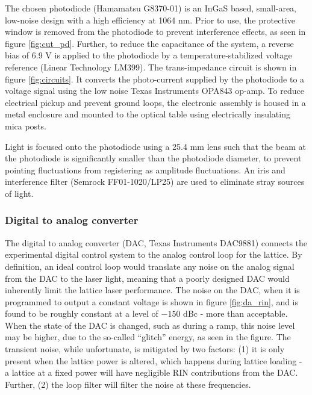 \documentclass[twocolumn,aps,pra,showpacs,preprintnumbers,bibnotes]{revtex4-1}
\begin{document}
The chosen photodiode (Hamamatsu G8370-01) is an InGaS based, small-area, low-noise design with a high efficiency at 1064 nm.
Prior to use, the protective window is removed from the photodiode to prevent interference effects, as seen in figure \ref{fig:cut_pd}.
Further, to reduce the capacitance of the system, a reverse bias of 6.9 V is applied to the photodiode by a temperature-stabilized voltage reference (Linear Technology LM399).
The trans-impedance circuit is shown in figure \ref{fig:circuits}. 
It converts the photo-current supplied by the photodiode to a voltage signal using the low noise Texas Instruments OPA843 op-amp. 
To reduce electrical pickup and prevent ground loops, the electronic assembly is housed in a metal enclosure and mounted to the optical table using electrically insulating mica posts. 

Light is focused onto the photodiode using a 25.4 mm lens such that the beam at the photodiode is significantly smaller than the photodiode diameter, to prevent pointing fluctuations from registering as amplitude fluctuations. 
An iris and interference filter (Semrock FF01-1020/LP25) are used to eliminate stray sources of light. 


\subsubsection{Digital to analog converter}
The digital to analog converter (DAC, Texas Instruments DAC9881) connects the experimental digital control system to the analog control loop for the lattice. 
By definition, an ideal control loop would translate any noise on the analog signal from the DAC to the laser light, meaning that a poorly designed DAC would inherently limit the lattice laser performance.
The noise on the DAC, when it is programmed to output a constant voltage is shown in figure \ref{fig:da_rin}, and is found to be roughly constant at a level of $-150$ dBc - more than acceptable.
When the state of the DAC is changed, such as during a ramp, this noise level may be higher, due to the so-called ``glitch'' energy, as seen in the figure.
The transient noise, while unfortunate, is mitigated by two factors: (1) it is only present when the lattice power is altered, which happens during lattice loading - a lattice at a fixed power will have negligible RIN contributions from the DAC. Further, (2) the loop filter will filter the noise at these frequencies. 
\end{document}
